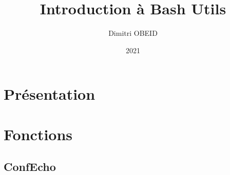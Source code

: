 \documentclass[a4paper,10pt]{article}
\title{\color{red}Introduction à Bash Utils}\color{white}
\author{Dimitri OBEID}
\date{2021}
\begin{document}
\maketitle
\newpage

\hypertarget{contents}{}
\tableofcontents
\newpage

\color{red}
\section{Présentation}\color{white}


\color{red}
\section{Fonctions}\color{white}

\color{green}
\subsection{ConfEcho}\color{white}
\end{document}
